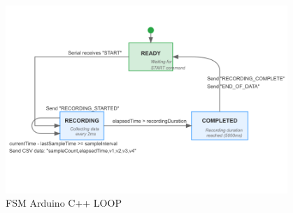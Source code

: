 \begin{figure}[htbp] %
  \centering
  \includegraphics[width=0.95\textwidth]{chapters/methodology/ArduinoDAQ/arduino_loop_FSM.png}
  \caption{FSM Arduino C++ LOOP}
  \label{fig:arduinoFSM}
\end{figure}

